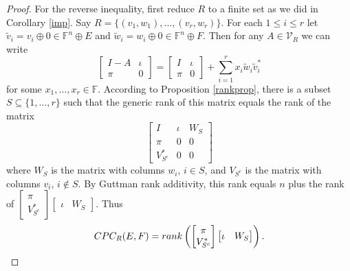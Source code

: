 \documentclass[10pt,a4paper]{amsart}
\begin{document}
\begin{proof}
For the reverse inequality, first reduce $R$ to a finite set as we did in Corollary \ref{imp}. Say $R = \{(v_1, w_1), \ldots, (v_r, w_r)\}$. For each $1 \leq i \leq r$ let $\tilde{v}_i = v_i \oplus 0 \in \mathbb{F}^n \oplus E$ and $\tilde{w}_i = w_i \oplus 0 \in \mathbb{F}^n \oplus F$. Then for any $A \in \mathcal{V}_R$ we can write $$\left[\begin{matrix}I - A& \iota\\ \pi&0\end{matrix}\right] = \left[\begin{matrix}I& \iota\\ \pi&0\end{matrix}\right] + \sum_{i=1}^r x_i\tilde{w}_i\tilde{v}_i^*$$ for some $x_1, \ldots, x_r \in \mathbb{F}$. According to Proposition \ref{rankprop}, there is a subset $S \subseteq \{1, \ldots, r\}$ such that the generic rank of this matrix equals the rank of the matrix $$\left[\begin{matrix}I & \iota & W_S\\ \pi & 0 & 0\\ V_{S^c}^* & 0 & 0\end{matrix}\right]$$ where $W_S$ is the matrix with columns $w_i$, $i \in S$, and $V_{S^c}$ is the matrix with columns $v_i$, $i \not\in S$. By Guttman rank additivity, this rank equals $n$ plus the rank of $\left[\begin{matrix}\pi\\ V_{S^c}^*\end{matrix}\right]\left[\begin{matrix}\iota & W_S\end{matrix}\right]$. Thus $$CPC_R(E,F) = {\rm rank}\left(\left[\begin{matrix}\pi\\ V_{S^c}^*\end{matrix}\right]\left[\begin{matrix}\iota & W_S\end{matrix}\right]\right).$$


\end{proof}
\end{document}
